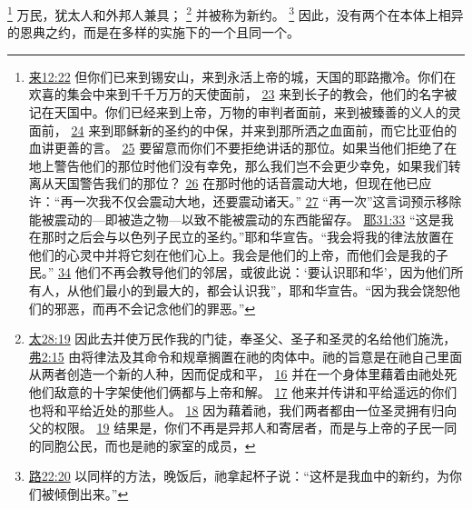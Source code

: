 \documentclass[12pt, a4paper, oneside]{ctexart}
\begin{document}
	\footnote {
		\href{https://biblehub.com/hebrews/12-22.htm}{来12:22} 但你们已来到锡安山，来到永活上帝的城，天国的耶路撒冷。你们在欢喜的集会中来到千千万万的天使面前，
		\href{https://biblehub.com/hebrews/12-23.htm}{23} 来到长子的教会，他们的名字被记在天国中。你们已经来到上帝，万物的审判者面前，来到被臻善的义人的灵面前，
		\href{https://biblehub.com/hebrews/12-24.htm}{24} 来到耶稣新的圣约的中保，并来到那所洒之血面前，而它比亚伯的血讲更善的言。
		\href{https://biblehub.com/hebrews/12-25.htm}{25} 要留意而你们不要拒绝讲话的那位。如果当他们拒绝了在地上警告他们的那位时他们没有幸免，那么我们岂不会更少幸免，如果我们转离从天国警告我们的那位？
		\href{https://biblehub.com/hebrews/12-26.htm}{26} 在那时他的话音震动大地，但现在他已应许：“再一次我不仅会震动大地，还要震动诸天。”
		\href{https://biblehub.com/hebrews/12-27.htm}{27} “再一次”这言词预示移除能被震动的---即被造之物---以致不能被震动的东西能留存。
		\href{https://biblehub.com/jeremiah/31-33.htm}{耶31:33} “这是我在那时之后会与以色列子民立的圣约。”耶和华宣告。“我会将我的律法放置在他们的心灵中并将它刻在他们心上。我会是他们的上帝，而他们会是我的子民。”
		\href{https://biblehub.com/jeremiah/31-34.htm}{34} 他们不再会教导他们的邻居，或彼此说：‘要认识耶和华’，因为他们所有人，从他们最小的到最大的，都会认识我”，耶和华宣告。“因为我会饶恕他们的邪恶，而再不会记念他们的罪恶。”	
	}
	万民，犹太人和外邦人兼具；
	\footnote {
		\href{https://biblehub.com/matthew/28-19.htm}{太28:19} 因此去并使万民作我的门徒，奉圣父、圣子和圣灵的名给他们施洗，
		\href{https://biblehub.com/ephesians/2-15.htm}{弗2:15} 由将律法及其命令和规章搁置在祂的肉体中。祂的旨意是在祂自己里面从两者创造一个新的人种，因而促成和平，
		\href{https://biblehub.com/ephesians/2-16.htm}{16} 并在一个身体里藉着由祂处死他们敌意的十字架使他们俩都与上帝和解。
		\href{https://biblehub.com/ephesians/2-17.htm}{17} 他来并传讲和平给遥远的你们也将和平给近处的那些人。
		\href{https://biblehub.com/ephesians/2-18.htm}{18} 因为藉着祂，我们两者都由一位圣灵拥有归向父的权限。
		\href{https://biblehub.com/ephesians/2-19.htm}{19} 结果是，你们不再是异邦人和寄居者，而是与上帝的子民一同的同胞公民，而也是祂的家室的成员，
	}
	并被称为新约。
	\footnote {
		\href{https://biblehub.com/luke/22-20.htm}{路22:20} 以同样的方法，晚饭后，祂拿起杯子说：“这杯是我血中的新约，为你们被倾倒出来。”
	}
	因此，没有两个在本体上相异的恩典之约，而是在多样的实施下的一个且同一个。
\end{document}
